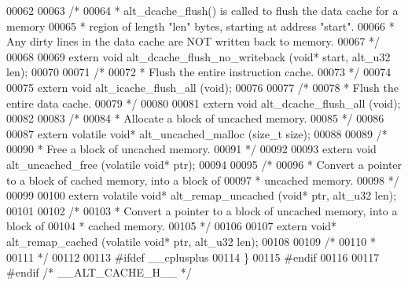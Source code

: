 \begin{DoxyCode}
00062 
00063 \textcolor{comment}{/*}
00064 \textcolor{comment}{ * alt\_dcache\_flush() is called to flush the data cache for a memory}
00065 \textcolor{comment}{ * region of length "len" bytes, starting at address "start".}
00066 \textcolor{comment}{ * Any dirty lines in the data cache are NOT written back to memory.}
00067 \textcolor{comment}{ */}
00068 
00069 \textcolor{keyword}{extern} \textcolor{keywordtype}{void} alt_dcache_flush_no_writeback (\textcolor{keywordtype}{void}* start, alt_u32 len);
00070 
00071 \textcolor{comment}{/*}
00072 \textcolor{comment}{ * Flush the entire instruction cache.}
00073 \textcolor{comment}{ */}
00074 
00075 \textcolor{keyword}{extern} \textcolor{keywordtype}{void} alt_icache_flush_all (\textcolor{keywordtype}{void});
00076 
00077 \textcolor{comment}{/*}
00078 \textcolor{comment}{ * Flush the entire data cache.}
00079 \textcolor{comment}{ */}
00080 
00081 \textcolor{keyword}{extern} \textcolor{keywordtype}{void} alt_dcache_flush_all (\textcolor{keywordtype}{void});
00082 
00083 \textcolor{comment}{/*}
00084 \textcolor{comment}{ * Allocate a block of uncached memory.}
00085 \textcolor{comment}{ */}
00086 
00087 \textcolor{keyword}{extern} \textcolor{keyword}{volatile} \textcolor{keywordtype}{void}* alt_uncached_malloc (\textcolor{keywordtype}{size\_t} size);
00088 
00089 \textcolor{comment}{/*}
00090 \textcolor{comment}{ * Free a block of uncached memory.}
00091 \textcolor{comment}{ */}
00092 
00093 \textcolor{keyword}{extern} \textcolor{keywordtype}{void} alt_uncached_free (\textcolor{keyword}{volatile} \textcolor{keywordtype}{void}* ptr);
00094 
00095 \textcolor{comment}{/*}
00096 \textcolor{comment}{ * Convert a pointer to a block of cached memory, into a block of}
00097 \textcolor{comment}{ * uncached memory.}
00098 \textcolor{comment}{ */}
00099 
00100 \textcolor{keyword}{extern} \textcolor{keyword}{volatile} \textcolor{keywordtype}{void}* alt_remap_uncached (\textcolor{keywordtype}{void}* ptr, alt_u32 len);
00101 
00102 \textcolor{comment}{/*}
00103 \textcolor{comment}{ * Convert a pointer to a block of uncached memory, into a block of}
00104 \textcolor{comment}{ * cached memory.}
00105 \textcolor{comment}{ */}
00106 
00107 \textcolor{keyword}{extern} \textcolor{keywordtype}{void}* alt_remap_cached (\textcolor{keyword}{volatile} \textcolor{keywordtype}{void}* ptr, alt_u32 len);
00108 
00109 \textcolor{comment}{/*}
00110 \textcolor{comment}{ *}
00111 \textcolor{comment}{ */}
00112 
00113 \textcolor{preprocessor}{#ifdef \_\_cplusplus}
00114 \}
00115 \textcolor{preprocessor}{#endif}
00116   
00117 \textcolor{preprocessor}{#endif }\textcolor{comment}{/* \_\_ALT\_CACHE\_H\_\_ */}\textcolor{preprocessor}{}
\end{DoxyCode}
